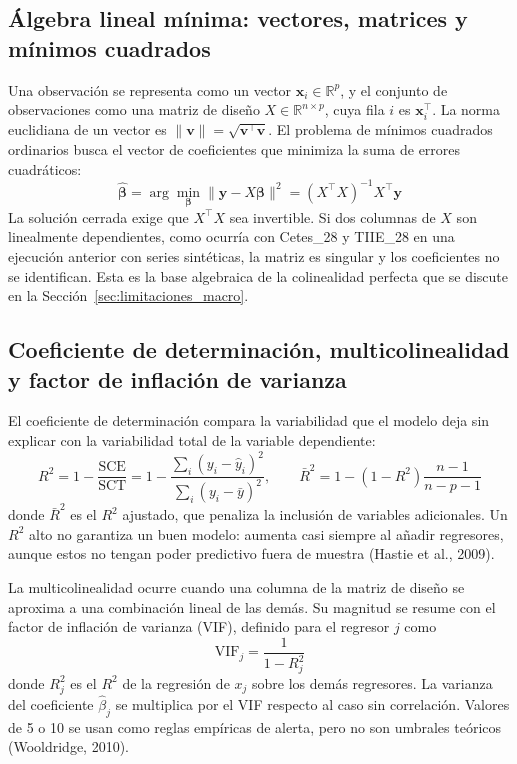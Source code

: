 \subsection{Álgebra lineal mínima: vectores, matrices y mínimos cuadrados}
Una observación se representa como un vector $\mathbf{x}_i\in\mathbb{R}^p$, y el conjunto de observaciones como una matriz de diseño $X\in\mathbb{R}^{n\times p}$, cuya fila $i$ es $\mathbf{x}_i^\top$. La norma euclidiana de un vector es $\|\mathbf{v}\|=\sqrt{\mathbf{v}^\top\mathbf{v}}$. El problema de mínimos cuadrados ordinarios busca el vector de coeficientes que minimiza la suma de errores cuadráticos:
\begin{equation}
\hat{\boldsymbol{\beta}} = \arg\min_{\boldsymbol{\beta}}\|\mathbf{y}-X\boldsymbol{\beta}\|^2 = (X^\top X)^{-1}X^\top\mathbf{y}
\label{eq:mco}
\end{equation}
La solución cerrada exige que $X^\top X$ sea invertible. Si dos columnas de $X$ son linealmente dependientes, como ocurría con Cetes\_28 y TIIE\_28 en una ejecución anterior con series sintéticas, la matriz es singular y los coeficientes no se identifican. Esta es la base algebraica de la colinealidad perfecta que se discute en la Sección~\ref{sec:limitaciones_macro}.

\subsection{Coeficiente de determinación, multicolinealidad y factor de inflación de varianza}
El coeficiente de determinación compara la variabilidad que el modelo deja sin explicar con la variabilidad total de la variable dependiente:
\begin{equation}
R^2 = 1-\frac{\text{SCE}}{\text{SCT}}=1-\frac{\sum_i (y_i-\hat{y}_i)^2}{\sum_i (y_i-\bar{y})^2}, \qquad \bar{R}^2 = 1-(1-R^2)\frac{n-1}{n-p-1}
\label{eq:r2}
\end{equation}
donde $\bar{R}^2$ es el $R^2$ ajustado, que penaliza la inclusión de variables adicionales. Un $R^2$ alto no garantiza un buen modelo: aumenta casi siempre al añadir regresores, aunque estos no tengan poder predictivo fuera de muestra (Hastie et al., 2009).

La multicolinealidad ocurre cuando una columna de la matriz de diseño se aproxima a una combinación lineal de las demás. Su magnitud se resume con el factor de inflación de varianza (VIF), definido para el regresor $j$ como
\begin{equation}
\text{VIF}_j=\frac{1}{1-R_j^2}
\label{eq:vif}
\end{equation}
donde $R_j^2$ es el $R^2$ de la regresión de $x_j$ sobre los demás regresores. La varianza del coeficiente $\hat{\beta}_j$ se multiplica por el VIF respecto al caso sin correlación. Valores de 5 o 10 se usan como reglas empíricas de alerta, pero no son umbrales teóricos (Wooldridge, 2010).

